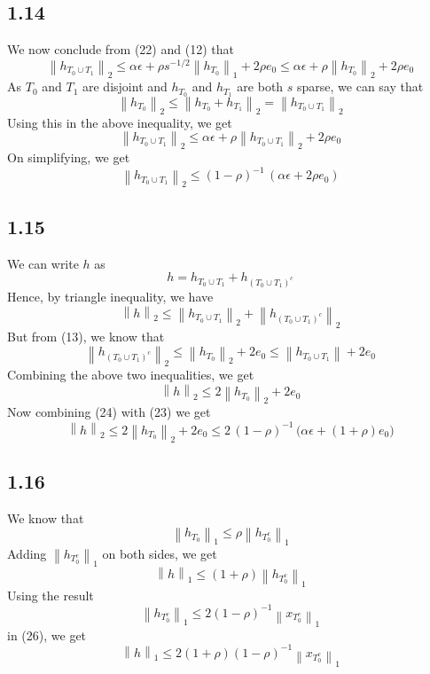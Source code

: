 \documentclass[12pt]{article}
\newcommand{\norm}[1]{\left\lVert #1 \right\rVert}
\begin{document}
\subsection*{1.14}
We now conclude from (22) and (12) that 
$$\norm{h_{T_0 \cup T_1}}_2 \leq \alpha \epsilon + \rho s^{-1/2}\norm{h_{T_0}}_1 + 2\rho e_0 \leq \alpha \epsilon + \rho \norm{h_{T_0}}_2 + 2\rho e_0$$
As $T_0$ and $T_1$ are disjoint and $h_{T_0}$ and $h_{T_1}$ are both $s$ sparse, we can say that 
$$\norm{h_{T_0}}_2 \leq \norm{h_{T_0} + h_{T_1}}_2 = \norm{h_{T_0 \cup T_1}}_2$$
Using this in the above inequality, we get
$$\norm{h_{T_0 \cup T_1}}_2 \leq \alpha \epsilon + \rho \norm{h_{T_0 \cup T_1}}_2 + 2 \rho e_0$$
On simplifying, we get
\begin{equation}
\norm{h_{T_0 \cup T_1}}_2 \leq (1 - \rho)^{-1} \, (\alpha \epsilon + 2\rho e_0)
\end{equation}
\subsection*{1.15}
We can write $h$ as
$$h = h_{T_0 \cup T_1} + h_{(T_0 \cup T_1)^c}$$
Hence, by triangle inequality, we have
$$\norm{h}_2 \leq \norm{h_{T_0 \cup T_1}}_2 + \norm{h_{(T_0 \cup T_1)^c}}_2$$
But from (13), we know that
$$\norm{h_{(T_0 \cup T_1)^c}}_2 \leq \norm{h_{T_0}}_2 + 2e_0 \leq \norm{h_{T_0 \cup T_1}} + 2e_0$$
Combining the above two inequalities, we get
\begin{equation}
\norm{h}_2 \leq 2 \norm{h_{T_0}}_2 + 2e_0
\end{equation}
Now combining (24) with (23) we get
\begin{equation}
\norm{h}_2 \leq 2 \norm{h_{T_0}}_2 + 2e_0 \leq 2\,(1 - \rho)^{-1}\,\big(\alpha \epsilon + (1 + \rho)e_0\big)
\end{equation}
\subsection*{1.16}
We know that
$$\norm{h_{T_0}}_1 \leq \rho \norm{h_{T_0^c}}_1$$
Adding $\norm{h_{T_0^c}}_1$ on both sides, we get
\begin{equation}
\norm{h}_1 \leq (1 + \rho) \norm{h_{T_0^c}}_1
\end{equation}
Using the result 
$$\norm{h_{T_0^c}}_1 \leq 2(1 - \rho)^{-1} \norm{x_{T_0^c}}_1$$
in (26), we get
\begin{equation}
\norm{h}_1 \leq 2(1+\rho)(1-\rho)^{-1} \norm{x_{T_0^c}}_1
\end{equation}
\newpage
\end{document}
